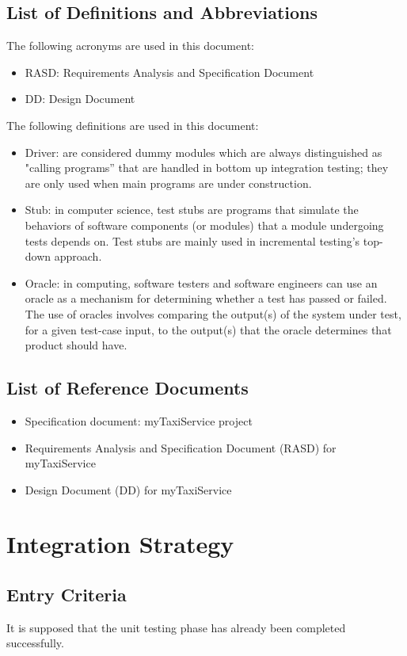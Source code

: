 \documentclass[a4paper,11pt]{report} %
\begin{document}
	\subsection{List of Definitions and Abbreviations}
		The following acronyms are used in this document:
		\begin{itemize}
			\item RASD: Requirements Analysis and Specification Document
			\item DD: Design Document
		\end{itemize}
		The following definitions are used in this document:
			\begin{itemize}
				\item Driver: are considered dummy modules which are always distinguished as "calling programs” that are handled in bottom up integration testing; they are only used when main programs are under construction.
				\item Stub: in computer science, test stubs are programs that simulate the behaviors of software components (or modules) that a module undergoing tests depends on. Test stubs are mainly used in incremental testing's top-down approach.
				\item Oracle: in computing, software testers and software engineers can use an oracle as a mechanism for determining whether a test has passed or failed. The use of oracles involves comparing the output(s) of the system under test, for a given test-case input, to the output(s) that the oracle determines that product should have.
			\end{itemize}
	\subsection{List of Reference Documents}
		\begin{itemize}
			\item Specification document: myTaxiService project
			\item Requirements Analysis and Specification Document (RASD) for myTaxiService
			\item Design Document (DD) for myTaxiService
		\end{itemize}
	
	
	\section{Integration Strategy}
	\subsection{Entry Criteria}
		It is supposed that the unit testing phase has already been completed successfully.
\end{document}
